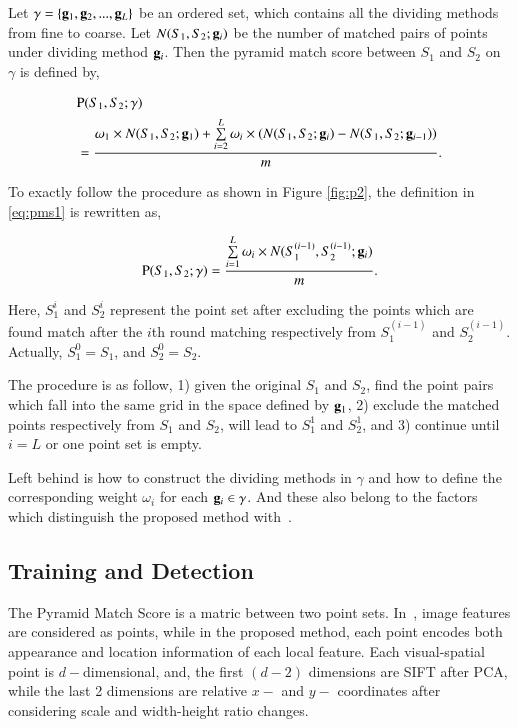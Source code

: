 \documentclass[paper]{ieice}
\begin{document}
Let $\gamma  = \{ {{\bf{g}}_1},{{\bf{g}}_2},...,{{\bf{g}}}_L\}$ be an ordered set, which contains all the dividing methods from fine to coarse. Let $N(S_1,S_2;{\bf{g}}_i)$ be the number of matched pairs of points under dividing method ${\bf{g}}_i$. Then the pyramid match score between $S_1$ and $S_2$ on $\gamma$ is defined by,

\begin{equation}
\begin{aligned}
&{\rm P}(S_1,S_2;\gamma)\\
&=\frac{{\omega}_1 \times N(S_1,S_2; {\bf{g}}_1) + \sum\limits^L_{i=2}{{\omega}_i\times( N(S_1,S_2;{\bf{g}}_i)-N(S_1,S_2;{\bf{g}}_{i-1}) ) }}{m}
.
\end{aligned}
\label{eq:pms1}
\end{equation}

To exactly follow the procedure as shown in Figure \ref{fig:p2}, the definition in \ref{eq:pms1} is rewritten as,

\begin{equation}
{\rm P}(S_1,S_2;\gamma)=\frac{ \sum\limits^L_{i=1}{{\omega}_i\times N(S_1^{(i-1)},S_2^{(i-1)};{\bf{g}}_i) }}{m}
.
\label{eq:pms2}
\end{equation}

Here, $S_1^i$ and $S_2^i$ represent the point set after excluding the points which are found match after the $i$th round matching respectively from $S_1^{(i-1)}$ and $S_2^{(i-1)}$. Actually, $S_1^0=S_1$, and $S_2^0=S_2$.

The procedure is  as follow, 1) given the original $S_1$ and $S_2$, find the point pairs which fall into the same grid in the space defined by ${\bf g}_1$, 2) exclude the matched points respectively from $S_1$ and $S_2$, will lead to $S_1^1$ and $S_2^1$, and 3) continue until $i=L$ or one point set is empty.

Left behind is how to construct the dividing methods in $\gamma$ and how to define the corresponding weight ${\omega}_i$ for each ${\bf{g}}_i \in \gamma$.
And these also belong to the factors which distinguish the proposed method with~\cite{pmk}.


\subsection{Training and Detection}

The Pyramid Match Score is a matric between two point sets. In~\cite{pmk}, image features are considered as points, while in the proposed method, each point encodes both appearance and location information of each local feature. Each visual-spatial point is $d-$dimensional, and, the first $(d-2)$ dimensions are SIFT after PCA, while the last 2 dimensions are relative $x-$ and $y-$ coordinates after considering scale and width-height ratio changes.
\end{document}
